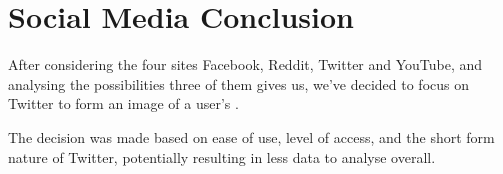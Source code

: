 \section{Social Media Conclusion}\label{sec:social-media-conclusion}

After considering the four sites Facebook, Reddit, Twitter and YouTube, and analysing the possibilities three of them
gives us, we've decided to focus on Twitter to form an image of a user's \fb .

The decision was made based on ease of use, level of access, and the short form nature of Twitter, potentially resulting
in less data to analyse overall.
